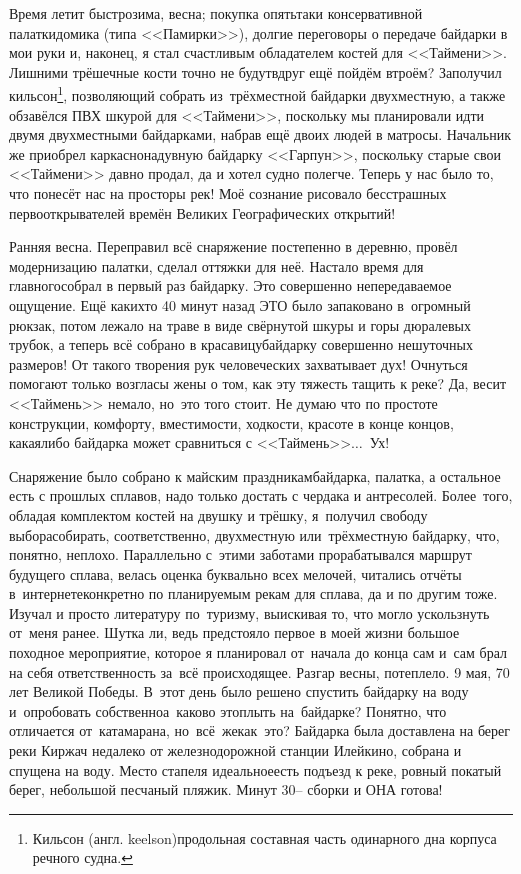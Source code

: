 Время летит быстро\mdash зима, весна; покупка опять\sdash таки консервативной палатки\sdash домика (типа <<Памирки>>), долгие переговоры о передаче байдарки в мои руки и, наконец, я стал счастливым обладателем костей для <<Таймени>>. Лишними трёшечные кости точно не будут\mdash вдруг ещё пойдём втроём? Заполучил кильсон\footnote{Кильсон (англ. keelson)\mdash продольная составная часть одинарного дна корпуса речного судна\cite{МорскойСправочник}.}, позволяющий собрать из~трёхместной байдарки двухместную, а также обзавёлся ПВХ шкурой для <<Таймени>>, поскольку мы планировали идти двумя двухместными байдарками, набрав ещё двоих людей в матросы. Начальник же приобрел каркасно\sdash надувную байдарку <<Гарпун>>, поскольку старые свои <<Таймени>> давно продал, да и хотел судно полегче. Теперь у нас было то, что понесёт нас на просторы рек! Моё сознание рисовало бесстрашных первооткрывателей времён Великих Географических открытий!

Ранняя весна. Переправил всё снаряжение постепенно в деревню, провёл модернизацию палатки, сделал оттяжки для неё. Настало время для главного\mdash собрал в первый раз байдарку. Это совершенно непередаваемое ощущение. Ещё каких\sdash то 40 минут назад ЭТО было запаковано в~огромный рюкзак, потом лежало на траве в виде свёрнутой шкуры и горы дюралевых трубок, а теперь всё собрано в красавицу\sdash байдарку совершенно нешуточных размеров! От такого творения рук человеческих захватывает дух! Очнуться помогают только возгласы жены о том, как эту тяжесть тащить к реке? Да, весит <<Таймень>> немало, но~это того стоит. Не думаю что по простоте конструкции, комфорту, вместимости, ходкости, красоте в конце концов, какая\sdash либо байдарка может сравниться с <<Таймень>>$\ldots$~Ух! 

Снаряжение было собрано к майским праздникам\mdash байдарка, палатка, а остальное есть с прошлых сплавов, надо только достать с чердака и антресолей. Более~того, обладая комплектом костей на двушку и трёшку, я~получил свободу выбора\mdash собирать, соответственно, двухместную или~трёхместную байдарку, что, понятно, неплохо. Параллельно с~этими заботами прорабатывался маршрут будущего сплава, велась оценка буквально всех мелочей, читались отчёты в~интернете\mdash конкретно по планируемым рекам для сплава, да и по другим тоже. Изучал и просто литературу по~туризму, выискивая то, что могло ускользнуть от~меня ранее. Шутка ли, ведь предстояло первое в моей жизни большое походное мероприятие, которое я планировал от~начала до конца сам и~сам брал на себя ответственность за~всё происходящее.
Разгар весны, потеплело. 9 мая, 70 лет Великой Победы. В~этот день было решено спустить байдарку на воду и~опробовать собственно\mdash а~каково это\mdash плыть на~байдарке? Понятно, что отличается от~катамарана, но~всё~же\mdash как~это? Байдарка была доставлена на берег реки Киржач недалеко от железнодорожной станции Илейкино, собрана и спущена на воду. Место стапеля идеальное\mdash есть подъезд к реке, ровный покатый берег, небольшой песчаный пляжик. Минут 30\thinspace-- сборки и ОНА готова!

